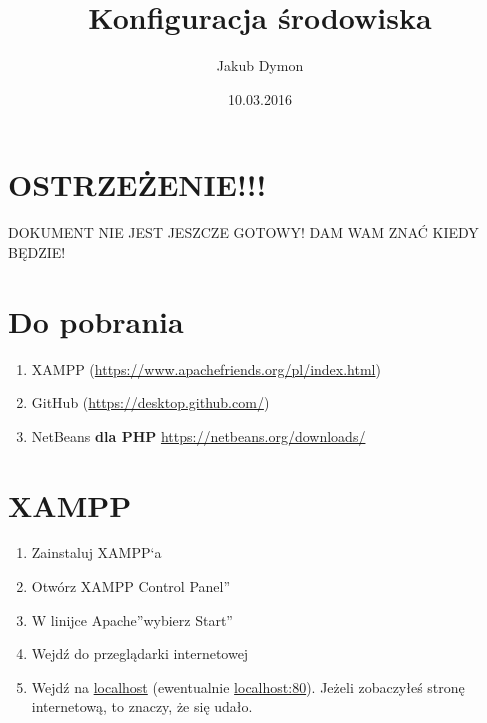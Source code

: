 \documentclass[a4paper, 11pt]{article}
\title{Konfiguracja środowiska}
\author{Jakub Dymon}
\date{10.03.2016}
\begin{document}
	\maketitle
	\section{OSTRZEŻENIE!!!}
	\begin{Large}
		DOKUMENT NIE JEST JESZCZE GOTOWY! DAM WAM ZNAĆ KIEDY BĘDZIE!
	\end{Large}
	\section{Do pobrania}
	\begin{enumerate}
		\item XAMPP (\url{https://www.apachefriends.org/pl/index.html})
		\item GitHub (\url{https://desktop.github.com/})
		\item NetBeans \textbf{dla PHP} {\url{https://netbeans.org/downloads/}}
	\end{enumerate}
	\section{XAMPP}
	\begin{enumerate}
		\item Zainstaluj XAMPP`a
		\item Otwórz \quotedblbase XAMPP Control Panel\textquotedblright
		\item W linijce \quotedblbase Apache\textquotedblright wybierz \quotedblbase Start\textquotedblright
		\item Wejdź do przeglądarki internetowej
		\item Wejdź na \url{localhost} (ewentualnie \url{localhost:80}). Jeżeli zobaczyłeś stronę internetową, to znaczy, że się udało.
	\end{enumerate}
\end{document}
